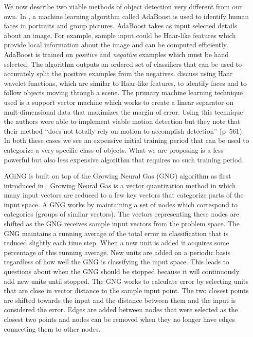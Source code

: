 \documentclass{article}
\renewcommand{\|}{\origbar} %
\begin{document}
We now describe two viable methods of object detection very different from our own. In , a machine learning algorithm called AdaBoost is used to identify human faces in portraits and group pictures. AdaBoost takes as input selected details about an image. For example, sample input could be Haar-like features which provide local information about the image and can be computed efficiently. AdaBoost is trained on {\em positive} and {\em negative} examples which must be hand selected. The algorithm outputs an ordered set of classifiers that can be used to accurately split the positive examples from the negatives.  discuss using Haar wavelet functions, which are similar to Haar-like features, to identify faces and to follow objects moving through a scene. The primary machine learning technique used is a support vector machine which works to create a linear separator on mult-dimensional data that maximizes the margin of error. Using this technique the authors were able to implement viable motion detection but they note that their method ``does not totally rely on motion to accomplish detection'' (p~561). In both these cases we see an expensive initial training period that can be used to categorize a very specific class of objects. What we are proposing is a less powerful but also less expensive algorithm that requires no such training period.

AGiNG is built on top of the Growing Neural Gas (GNG) algorithm as first introduced in . Growing Neural Gas is a vector quantization method in which many input vectors are reduced to a few key vectors that categorize parts of the input space. A GNG works by maintaining a set of nodes which correspond to categories (groups of similar vectors). The vectors representing these nodes are shifted as the GNG receives sample input vectors from the problem space. The GNG maintains a running average of the total error in classification that is reduced slightly each time step. When a new unit is added it acquires some percentage of this running average. New units are added on a periodic basis regardless of how well the GNG is classifying the input space. This leads to questions about when the GNG should be stopped because it will continuously add new units until stopped. The GNG works to calculate error by selecting units that are close in vector distance to the sample input point. The two closest points are shifted towards the input and the distance between them and the input is considered the error. Edges are added between nodes that were selected as the closest two points and nodes can be removed when they no longer have edges connecting them to other nodes.
\end{document}
